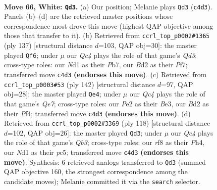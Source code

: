 \documentclass[11pt]{article}
\begin{document}
\clearpage

\begin{figure}[p]\centering
\begin{subfigure}{0.46\textwidth}\centering
\resizebox{\linewidth}{!}{%
\newchessgame
\chessboard[
  setfen={5r2/3qb1k1/5n2/P1p2p1p/2Qp1Pp1/8/1R1BP2P/3N2K1 w - - 7 66},
  showmover=false,
  pgfstyle=straightmove, color=movearrow, markmove={c4-d3}
]}
\caption{}
\end{subfigure}\hfill
\begin{subfigure}{0.46\textwidth}\centering
\resizebox{\linewidth}{!}{%
\newchessgame
\chessboard[
  setfen={8/1p3pk1/3q2p1/3Pp3/P2bP3/1B4P1/2Q2PK1/8 b - - 38 69},
  showmover=false,
  pgfstyle=straightmove, color=movearrow, markmove={d6-f6}
]}
\caption{}
\end{subfigure}
\\[4pt]
\begin{subfigure}{0.46\textwidth}\centering
\resizebox{\linewidth}{!}{%
\newchessgame
\chessboard[
  setfen={5nk1/4Qpb1/3p2p1/3P3p/p4P2/q3B1PP/6RK/8 w - - 1 72},
  showmover=false,
  pgfstyle=straightmove, color=movearrow, markmove={e7-e4}
]}
\caption{}
\end{subfigure}\hfill
\begin{subfigure}{0.46\textwidth}\centering
\resizebox{\linewidth}{!}{%
\newchessgame
\chessboard[
  setfen={R2b4/3qr1k1/1p4p1/2p1p2p/2PpB2P/1Q4P1/5PK1/8 w - - 6 60},
  showmover=false,
  pgfstyle=straightmove, color=movearrow, markmove={b3-d3}
]}
\caption{}
\end{subfigure}
\caption{\textbf{Move 66, White: \texttt{Qd3}.} (a) Our position; Melanie plays \texttt{Qd3} (\texttt{c4d3}). Panels (b)--(d) are the retrieved master positions whose correspondence most drove this move (highest QAP objective among those that transfer to it). (b) Retrieved from \texttt{ccrl\_top\_p0002\#1365} (ply 137) [structural distance $d$=103, QAP obj=30]: the master played \texttt{Qf6}; under $\mu$ our \emph{Qc4} plays the role of that game's \emph{Qd3}; cross-type roles: our \emph{N}d1 as their \emph{P}b7, our \emph{B}d2 as their \emph{P}f7; transferred move \texttt{c4d3} \textbf{(endorses this move)}. (c) Retrieved from \texttt{ccrl\_top\_p0003\#53} (ply 142) [structural distance $d$=97, QAP obj=28]: the master played \texttt{Qe4}; under $\mu$ our \emph{Qc4} plays the role of that game's \emph{Qe7}; cross-type roles: our \emph{P}e2 as their \emph{B}e3, our \emph{B}d2 as their \emph{P}f4; transferred move \texttt{c4d3} \textbf{(endorses this move)}. (d) Retrieved from \texttt{ccrl\_top\_p0002\#3369} (ply 118) [structural distance $d$=102, QAP obj=26]: the master played \texttt{Qd3}; under $\mu$ our \emph{Qc4} plays the role of that game's \emph{Qb3}; cross-type roles: our \emph{r}f8 as their \emph{P}h4, our \emph{N}d1 as their \emph{p}c5; transferred move \texttt{c4d3} \textbf{(endorses this move)}. Synthesis: 6 retrieved analogs transferred to \texttt{Qd3} (summed QAP objective 160, the strongest correspondence among the candidate moves); Melanie committed it via the \texttt{search} selector.}
\label{fig:thought-m130}
\end{figure}
\end{document}
